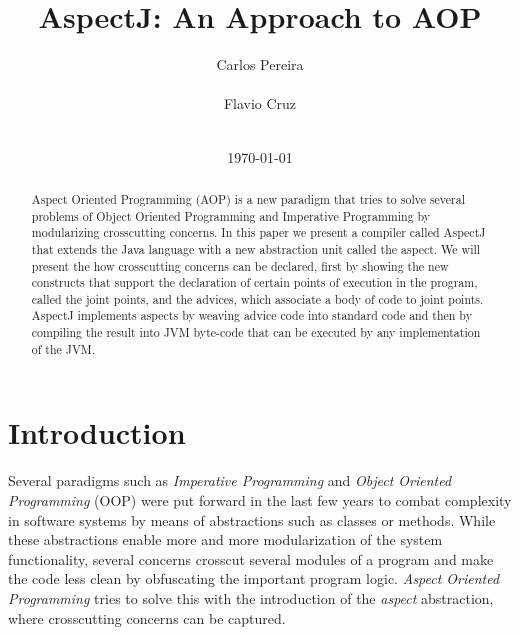\documentclass{template}
\begin{document}
\title{AspectJ: An Approach to AOP}


\author{
\alignauthor
Carlos Pereira\\
       \\
\alignauthor
Flavio Cruz\\
       \\
}
\date{\today}

\maketitle
\begin{abstract}
Aspect Oriented Programming (AOP) is a new paradigm that tries to solve several problems of
Object Oriented Programming and Imperative Programming by modularizing crosscutting concerns.
In this paper we present a compiler called AspectJ that extends
the Java language with a new abstraction unit called the aspect. We will present the
how crosscutting concerns can be declared, first by showing the new constructs that support
the declaration of certain points of execution in the program, called the joint points, and the
advices, which associate a body of code to joint points. AspectJ implements aspects by weaving advice
code into standard code and then by compiling the result into JVM byte-code that can be
executed by any implementation of the JVM.
 
\end{abstract}


\section{Introduction}

Several paradigms such as \emph{Imperative Programming} and \emph{Object Oriented Programming} (OOP) were put forward in the last few years
to combat complexity in software systems by means of abstractions such as classes or methods. While these abstractions enable
more and more modularization of the system functionality, several concerns crosscut several modules of a program and make
the code less clean by obfuscating the important program logic. \emph{Aspect Oriented Programming} tries to solve this
with the introduction of the \emph{aspect} abstraction, where crosscutting concerns can be captured.
\end{document}
